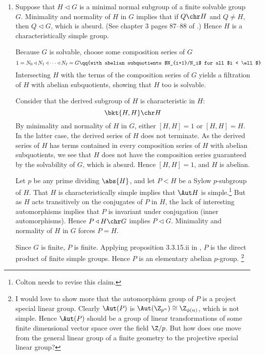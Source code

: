\documentclass[onesided]{ccg-pset}
\begin{document}
\begin{enumerate}
\item Suppose that $H \triangleleft G$ is a minimal normal subgroup of a finite solvable group $G$. Minimality and normality of $H$ in $G$ implies that if $Q \chr H$ and $Q \neq H$, then $Q \triangleleft G$, which is absurd. (See chapter 3 pages 87--88 of \cite{Rob96}.) Hence $H$ is a characteristically simple group. 

Because $G$ is solvable, choose some composition series of $G$
\begin{equation}
    \label{compseriesG}
    1 = N_0 \triangleleft N_1 \triangleleft \cdots \triangleleft N_\ell = G \qq{with abelian subquotients $N_{i+1}/N_i$ for all $i < \ell$}
\end{equation}
Intersecting $H$ with the terms of the composition series of $G$ yields a filtration of $H$ with abelian subquotients, showing that $H$ too is solvable. 

Consider that the derived subgroup of $H$ is characteristic in $H$: 
\begin{equation*}
    \bkt{H, H} \chr H
\end{equation*}
By minimality and normality of $H$ in $G$, either $[H,H] = 1$ or $[H, H] = H$. In the latter case, the derived series of $H$ does not terminate. As the derived series of $H$ has terms contained in every composition series of $H$ with abelian subquotients, we see that $H$ does not have the composition series guaranteed by the solvability of $G$, which is absurd. Hence $[H, H] = 1$, and $H$ is abelian.

Let $p$ be any prime dividing $\abs{H}$, and let $P < H$ be a Sylow $p$-subgroup of $H$. That $H$ is characteristically simple implies that $\Aut H$ is simple.\footnote{Colton needs to revise this claim.} But as $H$ acts transitively on the conjugates of $P$ in $H$, the lack of interesting automorphisms implies that $P$ is invariant under conjugation (inner automorphisms). Hence $P \triangleleft H \chr G$ implies $P \triangleleft G$. Minimality and normality of $H$ in $G$ forces $P = H$.

Since $G$ is finite, $P$ is finite. Applying proposition 3.3.15.ii in \cite{Rob96}, $P$ is the direct product of finite simple groups. Hence $P$ is an elementary abelian $p$-group.%
    \footnote{%
        I would love to show more that the automorphism group of $P$ is a project special linear group. Clearly $\Aut(P)$ is $\Aut(\Z_{p^n}) \cong \Z_{\phi(n)}$, which is not simple. Hence $\Aut(P)$ should be a group of linear transformations of some finite dimensional vector space over the field $\Z/p$. But how does one move from the general linear group of a finite geometry to the projective special linear group?
    }


\end{enumerate}
\end{document}
